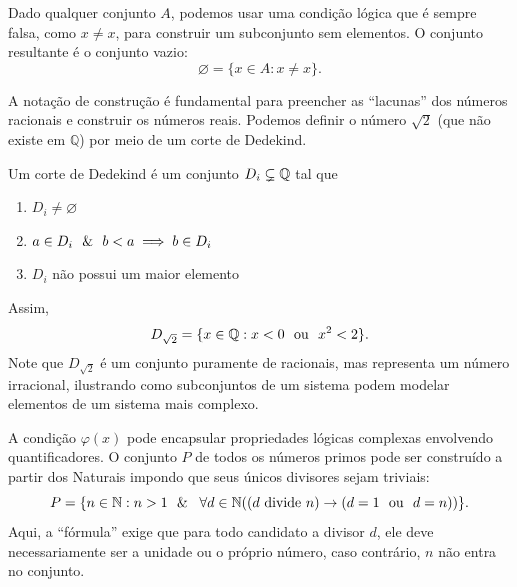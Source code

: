 \begin{exemplo}
    \label{ex:construcao_vazio_contradicao}
    Dado qualquer conjunto \(A\), podemos usar uma condição lógica que é sempre falsa, como \(x \neq x\), para construir um subconjunto sem elementos. O conjunto resultante é o conjunto vazio:
    \[
        \varnothing = \{x \in A : x \neq x\}.
    \]
\end{exemplo}

\begin{exemplo}
    A notação de construção é fundamental para preencher as ``lacunas''  dos números racionais e construir os números reais. Podemos definir o número \(\sqrt{2}\) (que não existe em \(\mathbb{Q}\)) por meio de um corte de Dedekind.

    Um corte de Dedekind é um conjunto \(D_i \subsetneq \mathbb{Q}\) tal que
    \begin{enumerate}
        \item \(D_i \neq \varnothing\)
        \item \(a \in D_i \ \ \& \ \  b < a \implies b \in D_i\)
        \item \(D_i\) não possui um maior elemento
    \end{enumerate}
    \label{def:corte_dedekind}

    Assim,
    \[
        D_{\sqrt{2}} = \{x \in \mathbb{Q} : x < 0 \ \text{ ou }\  x^2 < 2\}.
    \]
    Note que \(D_{\sqrt{2}}\) é um conjunto puramente de racionais, mas representa um número irracional, ilustrando como subconjuntos de um sistema podem modelar elementos de um sistema mais complexo.
\end{exemplo}

\begin{exemplo}
    A condição \(\varphi(x)\) pode encapsular propriedades lógicas complexas envolvendo quantificadores. O conjunto \(P\) de todos os números primos pode ser construído a partir dos Naturais impondo que seus únicos divisores sejam triviais:
    \[
        P = \{n \in \mathbb{N} : n > 1 \e \forall d \in \mathbb{N} ((d \text{ divide } n) \to (d = 1 \ou d = n))\}.
    \]
    Aqui, a ``fórmula'' exige que para todo candidato a divisor \(d\), ele deve necessariamente ser a unidade ou o próprio número, caso contrário, \(n\) não entra no conjunto.
\end{exemplo}

